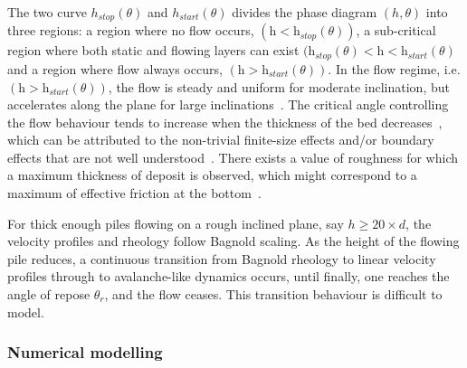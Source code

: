 The two curve $h_{stop}(\theta)$ and $h_{start}(\theta)$ divides the phase 
diagram $(h,\theta)$ into three regions: a region where no flow occurs, 
$(\textit{h}<\textit{h}_{\textit{stop}}(\theta))$, a sub-critical region where 
both static and flowing layers can exist $(\textit{h}_{\textit{stop}}(\theta) < 
\textit{h} < \textit{h}_{\textit{start}}(\theta)$ and a region where flow 
always occurs, $(\textit{h}>\textit{h}_{\textit{start}}(\theta))$. In the flow 
regime, i.e. $(\textit{h}>\textit{h}_{\textit{start}}(\theta))$, the flow is 
steady and uniform for moderate inclination, but accelerates along the plane 
for large inclinations~\citep{Midi2004}. The critical angle controlling the 
flow behaviour tends to increase when the thickness of the bed 
decreases~\citep{Pouliquen2002a,Daerr1999}, which can be attributed to the 
non-trivial finite-size effects and/or boundary effects that are not well 
understood~\citep{Forterre2008}. There exists a value of roughness for which a 
maximum thickness of deposit is observed, which might correspond to a maximum
of effective friction at the bottom~\citep{Midi2004}.

For thick enough piles flowing on a rough inclined plane, say $h \ge 20 \times 
d$, the velocity profiles and rheology follow Bagnold scaling. As the height of 
the flowing pile reduces, a continuous transition from Bagnold rheology to
linear velocity profiles through to avalanche-like dynamics occurs, until 
finally, one reaches the angle of repose $\theta_r$, and the
flow ceases. This transition behaviour is difficult to model. 

\subsubsection{Numerical modelling}

